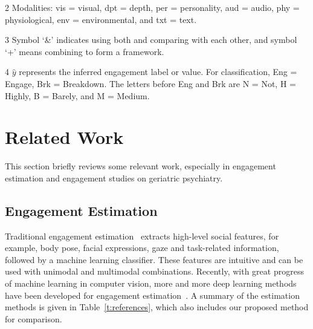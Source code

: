 \documentclass[VANCOUVER,STIX1COL]{WileyNJD-v2}
\begin{document}
\begin{table}[htb!]
\begin{threeparttable}[b]
\begin{tablenotes}
    \item [2] Modalities: vis = visual, dpt = depth, per = personality, aud = audio, phy = physiological, env = environmental, and txt = text.
    \item [3] Symbol `\&' indicates using both and comparing with each other, and symbol `+' means combining to form a framework.
    \item [4] $\hat{y}$ represents the inferred engagement label or value. For classification, Eng = Engage, Brk = Breakdown. The letters before Eng and Brk are N = Not, H = Highly, B = Barely, and M = Medium.
  \end{tablenotes}
 \end{threeparttable}
\end{table}

\section{Related Work}
\label{s:Related_Work}
This section briefly reviews some relevant work, especially in engagement estimation and engagement studies on geriatric psychiatry.

\subsection{Engagement Estimation}
\label{subs:Automated_Engagement_Estimation}

Traditional engagement estimation~\cite{Salam2017Fully,Celiktutan2019Multimodal,BenYoussef2019Early,Monkaresi2017Automated,Gao2020NGage} extracts high-level social features, for example, body pose, facial expressions, gaze and task-related information, followed by a machine learning classifier. These features are intuitive and can be used with unimodal and multimodal combinations. Recently, with great progress of machine learning in computer vision, more and more deep learning methods have been developed for engagement estimation~\cite{Saleh2021Improving,DelDuchetto2020Are,Zhu2020Multirate,Guhan2020ABCNet,Rudovic2019Personalized,Sumer2021Multimodal, Anagnostopoulou2021Engagement}. A summary of the estimation methods is given in Table~\ref{t:references}, which also includes our proposed method for comparison.
\end{document}
